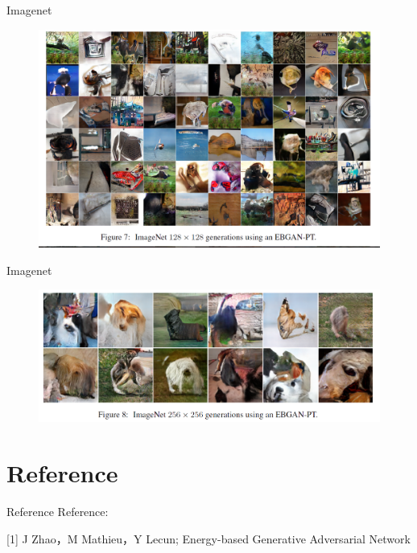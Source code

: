 \documentclass[mathserif]{beamer}
\begin{document}
\begin{frame}{Imagenet}
  \begin{figure}
    \includegraphics[scale=0.5]{fig/11.png}
    \label{}
  \end{figure}
\end{frame}
\begin{frame}{Imagenet}
  \begin{figure}
    \includegraphics[scale=0.5]{fig/12.png}
    \label{}
  \end{figure}
\end{frame}
\section{Reference}
\begin{frame}{Reference}
  Reference:

  [1] J Zhao，M Mathieu，Y Lecun; Energy-based Generative Adversarial Network
\end{frame}
\end{document}
